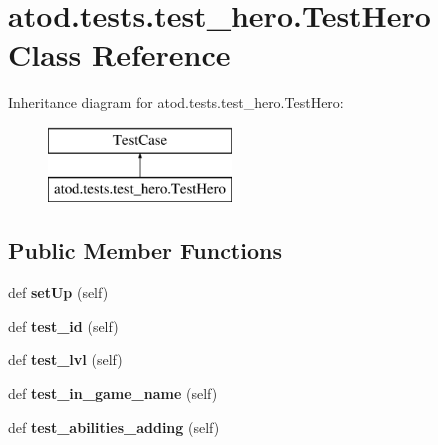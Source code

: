\hypertarget{classatod_1_1tests_1_1test__hero_1_1_test_hero}{}\section{atod.\+tests.\+test\+\_\+hero.\+Test\+Hero Class Reference}
\label{classatod_1_1tests_1_1test__hero_1_1_test_hero}
Inheritance diagram for atod.\+tests.\+test\+\_\+hero.\+Test\+Hero\+:\begin{figure}[H]
\begin{center}
\leavevmode
\includegraphics[height=2.000000cm]{classatod_1_1tests_1_1test__hero_1_1_test_hero}
\end{center}
\end{figure}
\subsection*{Public Member Functions}
\begin{DoxyCompactItemize}
\item 
def {\bfseries set\+Up} (self)\hypertarget{classatod_1_1tests_1_1test__hero_1_1_test_hero_a72d0d7fd2dff06de5d67ed08506d667f}{}\label{classatod_1_1tests_1_1test__hero_1_1_test_hero_a72d0d7fd2dff06de5d67ed08506d667f}

\item 
def {\bfseries test\+\_\+id} (self)\hypertarget{classatod_1_1tests_1_1test__hero_1_1_test_hero_a59ba3a7ede7a34356464678c92953664}{}\label{classatod_1_1tests_1_1test__hero_1_1_test_hero_a59ba3a7ede7a34356464678c92953664}

\item 
def {\bfseries test\+\_\+lvl} (self)\hypertarget{classatod_1_1tests_1_1test__hero_1_1_test_hero_a079911cb57f8780b93b316cfffa1538f}{}\label{classatod_1_1tests_1_1test__hero_1_1_test_hero_a079911cb57f8780b93b316cfffa1538f}

\item 
def {\bfseries test\+\_\+in\+\_\+game\+\_\+name} (self)\hypertarget{classatod_1_1tests_1_1test__hero_1_1_test_hero_a194afe7a65784ddc0c71bc50f7a0c466}{}\label{classatod_1_1tests_1_1test__hero_1_1_test_hero_a194afe7a65784ddc0c71bc50f7a0c466}

\item 
def {\bfseries test\+\_\+abilities\+\_\+adding} (self)\hypertarget{classatod_1_1tests_1_1test__hero_1_1_test_hero_a55685bf95449ca9c88393700039ab072}{}\label{classatod_1_1tests_1_1test__hero_1_1_test_hero_a55685bf95449ca9c88393700039ab072}

\end{DoxyCompactItemize}
